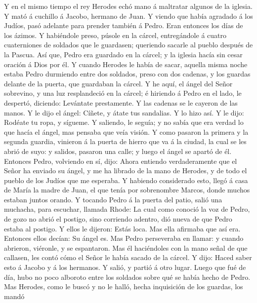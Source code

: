  Y en el mismo tiempo el rey Herodes echó mano á maltratar
algunos de la iglesia.  Y mató á cuchillo á Jacobo, hermano
de Juan.  Y viendo que había agradado á los Judíos, pasó
adelante para prender también á Pedro. Eran entonces los días de los
ázimos.  Y habiéndole preso, púsole en la cárcel,
entregándole á cuatro cuaterniones de soldados que le guardasen;
queriendo sacarle al pueblo después de la Pascua.  Así que,
Pedro era guardado en la cárcel; y la iglesia hacía sin cesar oración á
Dios por él.  Y cuando Herodes le había de sacar, aquella
misma noche estaba Pedro durmiendo entre dos soldados, preso con dos
cadenas, y los guardas delante de la puerta, que guardaban la cárcel.
 Y he aquí, el ángel del Señor sobrevino, y una luz
resplandeció en la cárcel; é hiriendo á Pedro en el lado, le despertó,
diciendo: Levántate prestamente. Y las cadenas se le cayeron de las
manos.  Y le dijo el ángel: Cíñete, y átate tus sandalias. Y
lo hizo así. Y le dijo: Rodéate tu ropa, y sígueme.  Y
saliendo, le seguía; y no sabía que era verdad lo que hacía el ángel,
mas pensaba que veía visión.  Y como pasaron la primera y
la segunda guardia, vinieron á la puerta de hierro que va á la ciudad,
la cual se les abrió de suyo: y salidos, pasaron una calle; y luego el
ángel se apartó de él.  Entonces Pedro, volviendo en sí,
dijo: Ahora entiendo verdaderamente que el Señor ha enviado su ángel, y
me ha librado de la mano de Herodes, y de todo el pueblo de los Judíos
que me esperaba.  Y habiendo considerado esto, llegó á casa
de María la madre de Juan, el que tenía por sobrenombre Marcos, donde
muchos estaban juntos orando.  Y tocando Pedro á la puerta
del patio, salió una muchacha, para escuchar, llamada Rhode:
 La cual como conoció la voz de Pedro, de gozo no abrió el
postigo, sino corriendo adentro, dió nueva de que Pedro estaba al
postigo.  Y ellos le dijeron: Estás loca. Mas ella afirmaba
que así era. Entonces ellos decían: Su ángel es.  Mas Pedro
perseveraba en llamar: y cuando abrieron, viéronle, y se espantaron.
 Mas él haciéndoles con la mano señal de que callasen, les
contó cómo el Señor le había sacado de la cárcel. Y dijo: Haced saber
esto á Jacobo y á los hermanos. Y salió, y partió á otro lugar.
 Luego que fué de día, hubo no poco alboroto entre los
soldados sobre qué se había hecho de Pedro.  Mas Herodes,
como le buscó y no le halló, hecha inquisición de los guardas, los mandó
